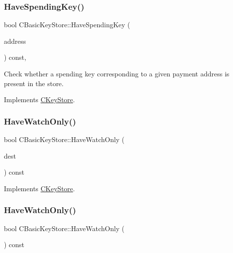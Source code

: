\subsubsection{\texorpdfstring{Have\+Spending\+Key()}{HaveSpendingKey()}}
{\footnotesize\ttfamily bool C\+Basic\+Key\+Store\+::\+Have\+Spending\+Key (\begin{DoxyParamCaption}\item[{const libzcash\+::\+Payment\+Address \&}]{address }\end{DoxyParamCaption}) const\hspace{0.3cm}{\ttfamily [inline]}, {\ttfamily [virtual]}}



Check whether a spending key corresponding to a given payment address is present in the store. 



Implements \mbox{\hyperlink{class_c_key_store_a15590101690f5a691b04a5498453b66a}{C\+Key\+Store}}.

\mbox{\label{class_c_basic_key_store_a3ce143be2a1d3e752972614cf7fb7efb}} 
\subsubsection{\texorpdfstring{Have\+Watch\+Only()}{HaveWatchOnly()}\hspace{0.1cm}{\footnotesize\ttfamily [1/2]}}
{\footnotesize\ttfamily bool C\+Basic\+Key\+Store\+::\+Have\+Watch\+Only (\begin{DoxyParamCaption}\item[{const C\+Script \&}]{dest }\end{DoxyParamCaption}) const\hspace{0.3cm}{\ttfamily [virtual]}}



Implements \mbox{\hyperlink{class_c_key_store_a15066cfd57feaffe0b9f4103c9311109}{C\+Key\+Store}}.

\mbox{\label{class_c_basic_key_store_aa6686d4477a180096436e7d491142f10}} 
\subsubsection{\texorpdfstring{Have\+Watch\+Only()}{HaveWatchOnly()}\hspace{0.1cm}{\footnotesize\ttfamily [2/2]}}
{\footnotesize\ttfamily bool C\+Basic\+Key\+Store\+::\+Have\+Watch\+Only (\begin{DoxyParamCaption}{ }\end{DoxyParamCaption}) const\hspace{0.3cm}{\ttfamily [virtual]}}



